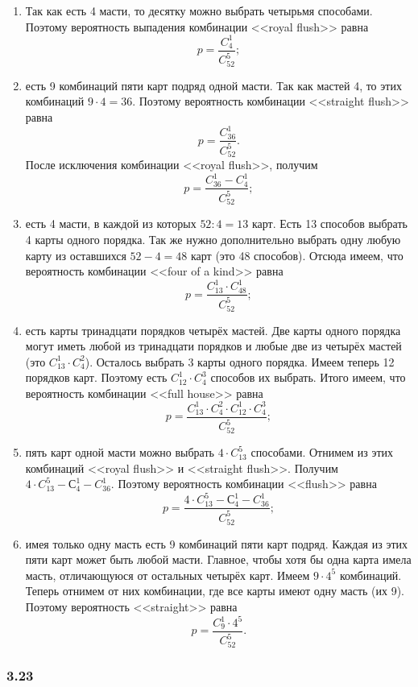 \begin{enumerate}[label=\alph*)]
\item Так как есть 4 масти, то десятку можно выбрать четырьмя способами.
Поэтому вероятность выпадения комбинации <<royal flush>> равна
$$ p =
\frac{ C_4^1 }{ C_{52}^5 };$$

\item есть 9 комбинаций пяти карт подряд одной масти.
Так как мастей 4, то этих комбинаций $ 9 \cdot 4 = 36 $.
Поэтому вероятность комбинации <<straight flush>> равна
$$ p =
\frac{ C_{36}^1 }{ C_{52}^5 }.$$
После исключения комбинации <<royal flush>>, получим
$$ p =
\frac{ C_{36}^1 - C_4^1 }{ C_{52}^5 };$$

\item есть 4 масти, в каждой из которых $ 52 : 4 = 13 $ карт.
Есть 13 способов выбрать 4 карты одного порядка.
Так же нужно дополнительно выбрать одну любую карту из оставшихся $ 52 - 4 = 48 $ карт (это 48 способов).
Отсюда имеем, что вероятность комбинации <<four of a kind>> равна
$$ p =
\frac{ C_{13}^1 \cdot C_{48}^1 }{ C_{52}^5 };$$

\item есть карты тринадцати порядков четырёх мастей.
Две карты одного порядка могут иметь любой из тринадцати порядков и любые две из четырёх мастей (это $ C_{13}^1 \cdot C_4^2 $).
Осталось выбрать 3 карты одного порядка. Имеем теперь 12 порядков карт.
Поэтому есть $ C_{12}^1 \cdot C_4^3 $ способов их выбрать.
Итого имеем, что вероятность комбинации <<full house>> равна
$$ p =
\frac{ C_{13}^1 \cdot C_4^2 \cdot C_{12}^1 \cdot C_4^3 }{ C_{52}^5 };$$

\item пять карт одной масти можно выбрать $ 4 \cdot C_{13}^5 $ способами.
Отнимем из этих комбинаций <<royal flush>> и <<straight flush>>.
Получим $ 4 \cdot C_{13}^5 - С_4^1 - C_{36}^1 $.
Поэтому вероятность комбинации <<flush>> равна
$$ p =
\frac{ 4 \cdot C_{13}^5 - С_4^1 - C_{36}^1 }{ C_{52}^5 };$$

\item имея только одну масть есть 9 комбинаций пяти карт подряд.
Каждая из этих пяти карт может быть любой масти.
Главное, чтобы хотя бы одна карта имела масть, отличающуюся от остальных четырёх карт.
Имеем $ 9 \cdot 4^5 $ комбинаций.
Теперь отнимем от них комбинации, где все карты имеют одну масть (их 9).
Поэтому вероятность <<straight>> равна
$$ p =
\frac{ C_9^1 \cdot 4^5 }{ C_{52}^5 }.$$
\end{enumerate}

\subsubsection*{3.23}

